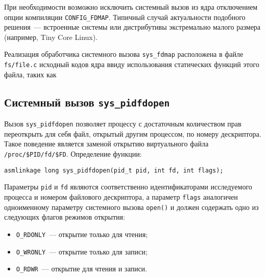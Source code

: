 При необходимости возможно исключить системный вызов из ядра отключением опции
компиляции \texttt{CONFIG\_FDMAP}. Типичный случай актуальности подобного
решения~--- встроенные системы или дистрибутивы экстремально малого размера
(например, Tiny Core Linux).

Реализация обработчика системного вызова \texttt{sys\_fdmap} расположена в файле
\texttt{fs/file.c} исходный кодов ядра ввиду использования статических функций
этого файла, таких как 

\subsection{Системный вызов \texttt{sys\_pidfdopen}}

Вызов \texttt{sys\_pidfdopen} позволяет процессу с достаточным количеством прав
переоткрыть для себя файл, открытый другим процессом, по номеру дескриптора.
Такое поведение является заменой открытию виртуального файла
\texttt{/proc/\$PID/fd/\$FD}. Определение функции: 

\medskip
\begin{lstlisting}[style=cstyle]
asmlinkage long sys_pidfdopen(pid_t pid, int fd, int flags);
\end{lstlisting}
\medskip

Параметры \texttt{pid} и \texttt{fd} являются соответственно идентификаторами
исследуемого процесса и номером файлового дескриптора, а параметр
\texttt{flags} аналогичен одноименному параметру системного вызова
\texttt{open()} и должен содержать одно из следующих флагов режимов открытия:
\begin{itemize}
\item \texttt{O\_RDONLY}~--- открытие только для чтения;
\item \texttt{O\_WRONLY}~--- открытие только для записи;
\item \texttt{O\_RDWR}~--- открытие для чтения и записи.
\end{itemize}

